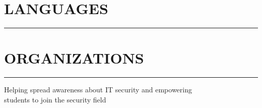 \documentclass[]{resume}
\begin{document}
%
%



%
%


\begin{minipage}[t]{0.265\textwidth}

    \vspace{26.5pt}


    \section{LANGUAGES}
    \noindent\rule{5 cm}{0.4pt}


    \vspace{2pt}
    
\end{minipage}


%
%

\hfill
\begin{minipage}[t]{0.66\textwidth}

    \vspace{-55.9pt}

    \section{ORGANIZATIONS}
    \noindent\rule{12.5cm}{0.4pt}

     
    \noindent

    \vspace{8pt}
     
    \noindent

    \vspace{8pt}
     
    \noindent
    \vspace{-8pt}
    \hspace{5em}
    \begin{minipage}{0.85\textwidth\vspace{4pt}}
        Helping spread awareness about IT security and empowering\\
        students to join the security field
    \end{minipage}

\end{minipage}
\end{document}
